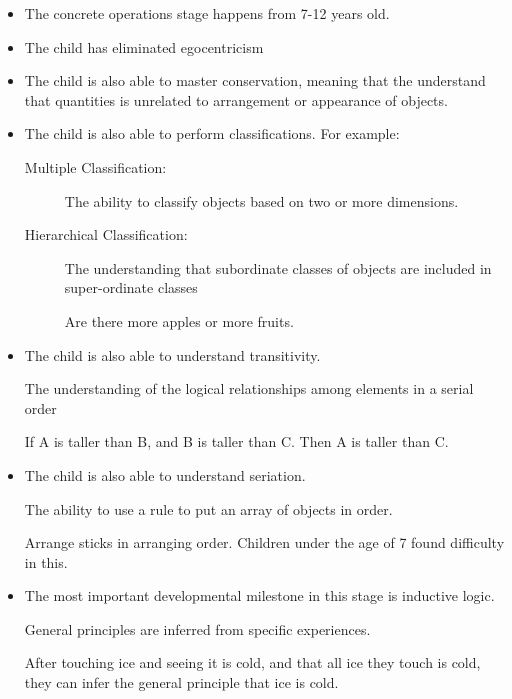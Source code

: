 \documentclass[../main/main.tex]{subfiles}
\begin{document}
\begin{itemize}
\item
The concrete operations stage happens from 7-12 years old.
  \item The child has eliminated egocentricism
\item The child is also able to master conservation, meaning that the understand that quantities is unrelated to arrangement or appearance of objects.
  \item The child is also able to perform classifications. For example:
       \begin{description}
         \item[Multiple Classification:] The ability to classify objects based on two or more dimensions.
         \item[Hierarchical Classification:]
               The understanding that subordinate classes of objects are included in super-ordinate classes
               \begin{example}
Are there more apples or more fruits.
               \end{example}
       \end{description}
  \item The child is also able to understand transitivity.
\begin{definition}
        The understanding of the logical relationships among elements in a serial order
\end{definition}
        \begin{example}
If A is taller than B, and B is taller than C. Then A is taller than C.
        \end{example}
  \item The child is also able to understand seriation.
        \begin{definition}
 The ability to use a rule to put an array of objects in order.
        \end{definition}
        \begin{example}
Arrange sticks in arranging order. Children under the age of 7 found difficulty in this.
        \end{example}
  \item The most important developmental milestone in this stage is inductive logic.
        \begin{definition} General principles are inferred from specific experiences.
        \end{definition}
        \begin{example}
After touching ice and seeing it is cold, and that all ice they touch is cold, they can infer the general principle that ice is cold.
        \end{example}
\end{itemize}
\end{document}
